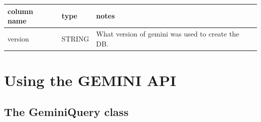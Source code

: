\documentclass[letterpaper,10pt,english]{sphinxmanual}
\begin{document}
\begin{tabulary}{\linewidth}{|L|L|L|}
\hline
\textbf{
column name
} & \textbf{
type
} & \textbf{
notes
}\\\hline

version
 & 
STRING
 & 
What version of gemini was used to create the DB.
\\\hline
\end{tabulary}



\section{Using the GEMINI API}
\label{content/api:using-the-gemini-api}\label{content/api::doc}\label{content/api:module-gemini}

\subsection{The GeminiQuery class}
\label{content/api:the-geminiquery-class}
\end{document}
